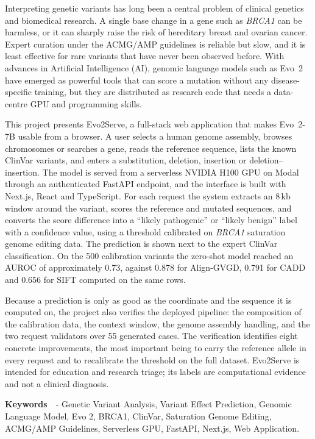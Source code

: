 \noindent Interpreting genetic variants has long been a central problem of clinical genetics and biomedical research. A single base change in a gene such as \textit{BRCA1} can be harmless, or it can sharply raise the risk of hereditary breast and ovarian cancer. Expert curation under the ACMG/AMP guidelines is reliable but slow, and it is least effective for rare variants that have never been observed before. With advances in Artificial Intelligence (AI), genomic language models such as Evo~2 have emerged as powerful tools that can score a mutation without any disease-specific training, but they are distributed as research code that needs a data-centre GPU and programming skills.

This project presents Evo2Serve, a full-stack web application that makes Evo~2-7B usable from a browser. A user selects a human genome assembly, browses chromosomes or searches a gene, reads the reference sequence, lists the known ClinVar variants, and enters a substitution, deletion, insertion or deletion--insertion. The model is served from a serverless NVIDIA H100 GPU on Modal through an authenticated FastAPI endpoint, and the interface is built with Next.js, React and TypeScript. For each request the system extracts an 8\,kb window around the variant, scores the reference and mutated sequences, and converts the score difference into a ``likely pathogenic'' or ``likely benign'' label with a confidence value, using a threshold calibrated on \textit{BRCA1} saturation genome editing data. The prediction is shown next to the expert ClinVar classification. On the 500 calibration variants the zero-shot model reached an AUROC of approximately 0.73, against 0.878 for Align-GVGD, 0.791 for CADD and 0.656 for SIFT computed on the same rows.

Because a prediction is only as good as the coordinate and the sequence it is computed on, the project also verifies the deployed pipeline: the composition of the calibration data, the context window, the genome assembly handling, and the two request validators over 55 generated cases. The verification identifies eight concrete improvements, the most important being to carry the reference allele in every request and to recalibrate the threshold on the full dataset. Evo2Serve is intended for education and research triage; its labels are computational evidence and not a clinical diagnosis.

\noindent\textbf{Keywords}\ \ - Genetic Variant Analysis, Variant Effect Prediction, Genomic Language Model, Evo 2, BRCA1, ClinVar, Saturation Genome Editing, ACMG/AMP Guidelines, Serverless GPU, FastAPI, Next.js, Web Application.
